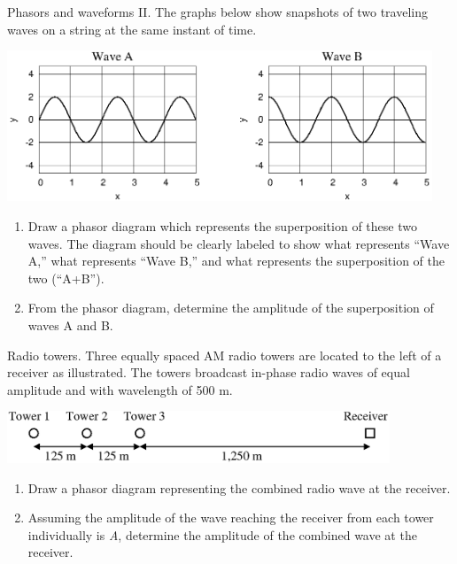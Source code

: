 \newpage

\begin{aproblem}{Phasors and waveforms II.}
  The graphs below show snapshots of two traveling waves on a string
  at the same instant of time.

  \begin{center}
    \includegraphics[width=5.0in]{additional_problems/a104fig}
  \end{center}

  \begin{enumerate}
  \item Draw a phasor diagram which represents the superposition of
    these two waves.  The diagram should be clearly labeled to show
    what represents ``Wave A,'' what represents ``Wave B,'' and what
    represents the superposition of the two (``A+B'').

  \item From the phasor diagram, determine the amplitude of the
    superposition of waves A and B.

  \end{enumerate}
\end{aproblem}


\begin{aproblem}{ Radio towers.}
  Three equally spaced AM radio towers are located to the left of a
  receiver as illustrated.  The towers broadcast in-phase radio waves
  of equal amplitude and with wavelength of 500 m.

  \vspace{2mm}
  \begin{center}
    \includegraphics[width=4.5in]{additional_problems/a105fig}
  \end{center}

  \begin{enumerate}

  \item Draw a phasor diagram representing the combined radio wave at
    the receiver.

  \item Assuming the amplitude of the wave reaching the receiver from
    each tower individually is {\em A}, determine the amplitude of the
    combined wave at the receiver.
    
  \end{enumerate}
\end{aproblem}


